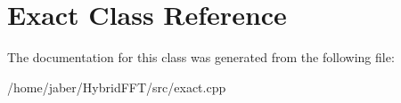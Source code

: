 \hypertarget{classExact}{}\section{Exact Class Reference}
\label{classExact}


The documentation for this class was generated from the following file\+:\begin{DoxyCompactItemize}
\item 
/home/jaber/\+Hybrid\+F\+F\+T/src/exact.\+cpp\end{DoxyCompactItemize}
